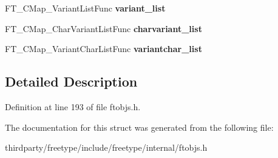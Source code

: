 \begin{DoxyCompactItemize}
\item 
\mbox{\label{struct_f_t___c_map___class_rec___ad61635444cbfc71c4259e74cb892c172}} 
F\+T\+\_\+\+C\+Map\+\_\+\+Variant\+List\+Func {\bfseries variant\+\_\+list}
\item 
\mbox{\label{struct_f_t___c_map___class_rec___a65db9dfa0e29b7de257dc8870532ab19}} 
F\+T\+\_\+\+C\+Map\+\_\+\+Char\+Variant\+List\+Func {\bfseries charvariant\+\_\+list}
\item 
\mbox{\label{struct_f_t___c_map___class_rec___ac1563590a0bac99082aa0996b94aad57}} 
F\+T\+\_\+\+C\+Map\+\_\+\+Variant\+Char\+List\+Func {\bfseries variantchar\+\_\+list}
\end{DoxyCompactItemize}


\subsection{Detailed Description}


Definition at line 193 of file ftobjs.\+h.



The documentation for this struct was generated from the following file\+:\begin{DoxyCompactItemize}
\item 
thirdparty/freetype/include/freetype/internal/ftobjs.\+h\end{DoxyCompactItemize}
